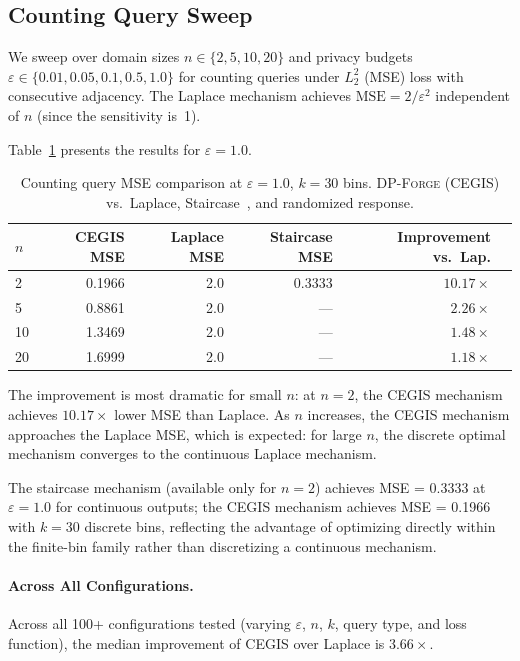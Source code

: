 \documentclass[11pt,a4paper]{article}
\newcommand{\dpforge}{\textsc{DP-Forge}}
\newcommand{\eps}{\varepsilon}
\begin{document}
\subsection{Counting Query Sweep}
\label{subsec:counting}

We sweep over domain sizes $n \in \{2, 5, 10, 20\}$ and privacy budgets
$\eps \in \{0.01, 0.05, 0.1, 0.5, 1.0\}$ for counting queries under $L_2^2$
(MSE) loss with consecutive adjacency.  The Laplace mechanism achieves
$\text{MSE} = 2/\eps^2$ independent of $n$ (since the sensitivity is~1).

Table~\ref{tab:counting} presents the results for $\eps = 1.0$.

\begin{table}[t]
\centering
\caption{Counting query MSE comparison at $\eps = 1.0$, $k = 30$ bins.
  \dpforge{} (CEGIS) vs.\ Laplace, Staircase~\cite{geng2014optimal}, and
  randomized response.}
\label{tab:counting}
\begin{tabular}{@{}lrrrrr@{}}
\toprule
$n$ & CEGIS MSE & Laplace MSE & Staircase MSE & Improvement vs.\ Lap. \\
\midrule
2   & 0.1966 & 2.0 & 0.3333 & $10.17\times$ \\
5   & 0.8861 & 2.0 & --- & $2.26\times$ \\
10  & 1.3469 & 2.0 & --- & $1.48\times$ \\
20  & 1.6999 & 2.0 & --- & $1.18\times$ \\
\bottomrule
\end{tabular}
\end{table}

The improvement is most dramatic for small $n$: at $n=2$, the CEGIS mechanism
achieves $10.17\times$ lower MSE than Laplace.  As $n$ increases, the CEGIS
mechanism approaches the Laplace MSE, which is expected: for large $n$, the
discrete optimal mechanism converges to the continuous Laplace mechanism.

The staircase mechanism (available only for $n=2$) achieves MSE = 0.3333 at
$\eps = 1.0$ for continuous outputs; the CEGIS mechanism achieves MSE = 0.1966
with $k=30$ discrete bins, reflecting the advantage of optimizing directly within
the finite-bin family rather than discretizing a continuous mechanism.

\paragraph{Across All Configurations.}
Across all 100+ configurations tested (varying $\eps$, $n$, $k$, query type, and
loss function), the median improvement of CEGIS over Laplace is $3.66\times$.
\end{document}
